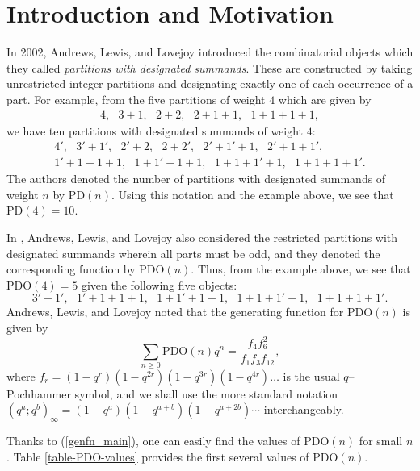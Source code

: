 \documentclass[11pt,reqno]{amsart}
\numberwithin{equation}{section}
\theoremstyle{plain}
\theoremstyle{definition}
\theoremstyle{named}
\def\PD{\mathrm{PD}}
\def\PDO{\mathrm{PDO}}
\begin{document}
\maketitle



\section{Introduction and Motivation}\label{sec:intro}



In 2002, Andrews, Lewis, and Lovejoy \cite{ALL02} introduced the combinatorial objects which they called {\it partitions with designated summands}.  These are constructed by taking unrestricted integer partitions and designating exactly one of each occurrence of a part.  For example, from the five partitions of weight $4$ which are given by 
\begin{gather*}
    4,\ \ \  3+1,\ \ \  2+2,\ \ \   2+1+1,\ \ \   1+1+1+1,
\end{gather*}
we have ten partitions with designated summands of weight $4$:  
\begin{gather*}
    4',\ \ \  3'+1',\ \ \  2'+2,\ \ \  2+2',\ \ \  2'+1'+1,\ \ \  2'+1+1',\\
    1'+1+1+1,\ \ \  1+1'+1+1,\ \ \  1+1+1'+1,\ \ \  1+1+1+1'.
\end{gather*}
The authors denoted the number of partitions with designated summands of weight $n$ by $\PD(n)$.  Using this notation and the example above, we see that $\PD(4)=10$.

In \cite{ALL02}, Andrews, Lewis, and Lovejoy also considered the restricted partitions with designated summands wherein all parts must be odd, and they denoted the corresponding function by $\PDO(n)$.  Thus, from the example above, we see that $\PDO(4)=5$ given the following five objects:  
$$
3'+1',\ \ \  1'+1+1+1,\ \ \  1+1'+1+1,\ \ \  1+1+1'+1,\ \ \  1+1+1+1'.
$$
Andrews, Lewis, and Lovejoy noted \cite[(1.6)]{ALL02} that the generating function for $\PDO(n)$ is given by 
\begin{equation}
    \label{genfn_main}
    \sum_{n\geq 0} \PDO(n)q^n = \frac{f_4f_6^2}{f_1f_3f_{12}},
\end{equation}
where $f_r = (1-q^r)(1-q^{2r})(1-q^{3r})(1-q^{4r})\dots$ is the usual $q$--Pochhammer symbol, and we shall use the more standard notation $(q^a;q^b)_{\infty}=(1-q^a)(1-q^{a+b})(1-q^{a+2b})\cdots$ interchangeably.

Thanks to (\ref{genfn_main}), one can easily find the values of $\PDO(n)$ for small $n$.  Table \ref{table-PDO-values} provides the first several values of $\PDO(n)$.  
\end{document}
